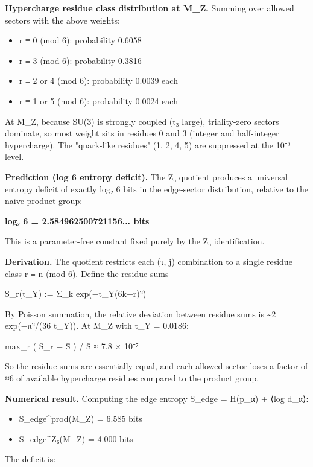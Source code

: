 \textbf{Hypercharge residue class distribution at M\_Z.} Summing over allowed sectors with the above weights:

\begin{itemize}
\tightlist
\item
  r ≡ 0 (mod 6): probability 0.6058
\item
  r ≡ 3 (mod 6): probability 0.3816
\item
  r ≡ 2 or 4 (mod 6): probability 0.0039 each
\item
  r ≡ 1 or 5 (mod 6): probability 0.0024 each
\end{itemize}

At M\_Z, because SU(3) is strongly coupled (t₃ large), triality-zero sectors dominate, so most weight sits in residues 0 and 3 (integer and half-integer hypercharge). The "quark-like residues" (1, 2, 4, 5) are suppressed at the 10⁻³ level.

\textbf{Prediction (log 6 entropy deficit).} The Z₆ quotient produces a universal entropy deficit of exactly log₂ 6 bits in the edge-sector distribution, relative to the naive product group:

\textbf{log₂ 6 = 2.584962500721156... bits}

This is a parameter-free constant fixed purely by the Z₆ identification.

\textbf{Derivation.} The quotient restricts each (τ, j) combination to a single residue class r ≡ n (mod 6). Define the residue sums

S\_r(t\_Y) := Σ\_k exp(−t\_Y(6k+r)²)

By Poisson summation, the relative deviation between residue sums is \textasciitilde2 exp(−π²/(36 t\_Y)). At M\_Z with t\_Y = 0.0186:

max\_r \textbar( S\_r − \={S} ) / \={S}\textbar{} ≈ 7.8 × 10⁻⁷

So the residue sums are essentially equal, and each allowed sector loses a factor of ≈6 of available hypercharge residues compared to the product group.

\textbf{Numerical result.} Computing the edge entropy S\_edge = H(p\_α) + ⟨log d\_α⟩:

\begin{itemize}
\tightlist
\item
  S\_edge\^{}prod(M\_Z) = 6.585 bits
\item
  S\_edge\^{}Z₆(M\_Z) = 4.000 bits
\end{itemize}

The deficit is:

